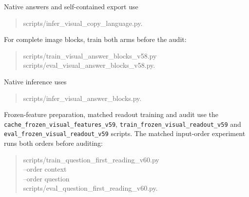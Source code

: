 \documentclass[10pt,a4paper]{article}
\begin{document}
Native answers and self-contained export use
\begin{quote}\small\ttfamily
scripts/infer\_visual\_copy\_language.py.
\end{quote}
For complete image blocks, train both arms before the audit:
\begin{quote}\small\ttfamily
scripts/train\_visual\_answer\_blocks\_v58.py\\
scripts/eval\_visual\_answer\_blocks\_v58.py.
\end{quote}
Native inference uses
\begin{quote}\small\ttfamily
scripts/infer\_visual\_answer\_blocks.py.
\end{quote}
Frozen-feature preparation, matched readout training and audit use the
\texttt{cache\_frozen\_visual\_features\_v59},
\texttt{train\_frozen\_visual\_readout\_v59} and
\texttt{eval\_frozen\_visual\_readout\_v59} scripts.
The matched input-order experiment runs both orders before auditing:
\begin{quote}\small\ttfamily
scripts/train\_question\_first\_reading\_v60.py\\
--order context\\
--order question\\
scripts/eval\_question\_first\_reading\_v60.py.
\end{quote}

\end{document}
